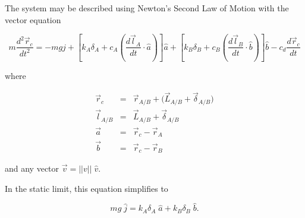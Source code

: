 \documentclass{article}
\begin{document}
The system may be described using Newton's Second Law of Motion with the vector equation

\begin{equation}
    m \frac{d^2\vec{r}_c}{dt^2} = -mg\hat{j} + \left[ k_A\delta_A + c_A \left( \frac{d\vec{l}_A}{dt} \cdot \hat{a} \right) \right] \hat{a} + \left[ k_B \delta_B + c_B \left( \frac{d\vec{l}_B}{dt} \cdot \hat{b} \right) \right] \hat{b} - c_d \frac{d\vec{r}_c}{dt}  
    \label{Eq:System9}
\end{equation}

where

\begin{eqnarray}
    \vec{r}_c & = & \vec{r}_{A/B} + \big( \vec{L}_{A/B} + \vec\delta_{A/B} \big) \\
    \vec{l}_{A/B} & = & \vec{L}_{A/B} + \vec\delta_{A/B} \nonumber \\
    \vec{a} & = & \vec{r}_c - \vec{r}_A \nonumber \\
    \vec{b} & = & \vec{r}_c - \vec{r}_B \nonumber
    \label{Eq:System9_helper}
\end{eqnarray}

and any vector $\vec{v} = ||v|| \; \hat{v}$.

In the static limit, this equation simplifies to 

\begin{equation}
    mg \; \hat{j} = k_A\delta_A \; \hat{a} + k_B\delta_B \; \hat{b}.
\end{equation}
\end{document}

